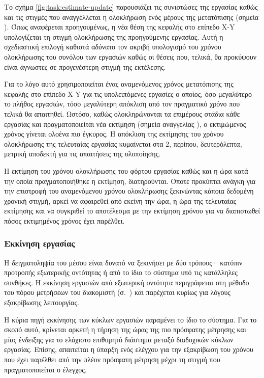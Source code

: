 Το σχήμα \ref{fig:task:estimate-update} παρουσιάζει τις συνιστώσες της εργασίας
καθώς και τις στιγμές που αναγγέλλεται η ολοκλήρωση ενός μέρους της μετατόπισης
(σημεία ).
Όπως αναφέρεται προηγουμένως, η νέα θέση της κεφαλής στο επίπεδο X-Y
υπολογίζεται τη στιγμή ολοκλήρωσης της προηγούμενης εργασίας. Αυτή η σχεδιαστική
επιλογή καθιστά αδύνατο τον ακριβή υπολογισμό του χρόνου ολοκλήρωσης του συνόλου
των εργασιών καθώς οι θέσεις που, τελικά, θα προκύψουν είναι άγνωστες σε
προγενέστερη στιγμή της εκτέλεσης.

Για το λόγο αυτό χρησιμοποιείται ένας αναμενόμενος χρόνος μετατόπισης της
κεφαλής στο επίπεδο X-Y για τις υπολειπόμενες εργασίες ο οποίος, όσο μεγαλύτερο
το πλήθος εργασιών, τόσο μεγαλύτερη απόκλιση από τον πραγματικό χρόνο που
τελικά θα απαιτηθεί. Ωστόσο, καθώς ολοκληρώνονται τα επιμέρους στάδια κάθε
εργασίας και πραγματοποιείται νέα εκτίμηση (σημεία αναγγελίας ), ο
εκτιμώμενος χρόνος γίνεται ολοένα πιο έγκυρος. Η απόκλιση της εκτίμησης του
χρόνου ολοκλήρωσης της τελευταίας εργασίας κυμαίνεται στα 2, περίπου,
δευτερόλεπτα, μετρική αποδεκτή για τις απαιτήσεις της υλοποίησης.

Η εκτίμηση του χρόνου ολοκλήρωσης του φόρτου εργασίας καθώς και η ώρα κατά την
οποία πραγματοποιήθηκε η εκτίμηση, διατηρούνται. Όποτε προκύπτει ανάγκη για την
επιστροφή του αναμενόμενου χρόνου ολοκλήρωσης ξεκινώντας κάποια δεδομένη χρονική
στιγμή, αρκεί να αφαιρεθεί από εκείνη την ώρα, η ώρα της τελευταίας εκτίμησης
και να συγκριθεί το αποτέλεσμα με την εκτίμηση χρόνου για να διαπιστωθεί πόσος
εκτιμημένος χρόνος έχει παρέλθει.


\subsubsection{Εκκίνηση εργασίας}
\label{ssubsec:task:initiate}

Η δειγματοληψία του μέσου είναι δυνατό να ξεκινήσει με δύο τρόπους· κατόπιν
προτροπής εξωτερικής οντότητας ή από το ίδιο το σύστημα υπό τις κατάλληλες
συνθήκες. Η εκκίνηση εργασιών από εξωτερική οντότητα περιγράφεται στη μέθοδο
 του πόρου μετρήσεων του διακομιστή
(σ.~\pageref{ssubsec:network:measurement-post}) και παρέχεται κυρίως για λόγους
εξακρίβωσης λειτουργίας.

Η κύρια πηγή εκκίνησης των κύκλων εργασιών παραμένει το ίδιο το σύστημα.
Για το σκοπό αυτό, κρίνεται
αρκετή η τήρηση της ώρας της πιο πρόσφατης μέτρησης και μίας ένδειξης για το
ελάχιστο επιθυμητό διάστημα μεταξύ διαδοχικών κύκλων εργασίας. Επίσης,
απαιτείται η ύπαρξη ενός ελέγχου για την εξακρίβωση του χρόνου που έχει παρέλθει
από την πλέον πρόσφατη μέτρηση μέχρι τη στιγμή που πραγματοποιείται ο έλεγχος.

